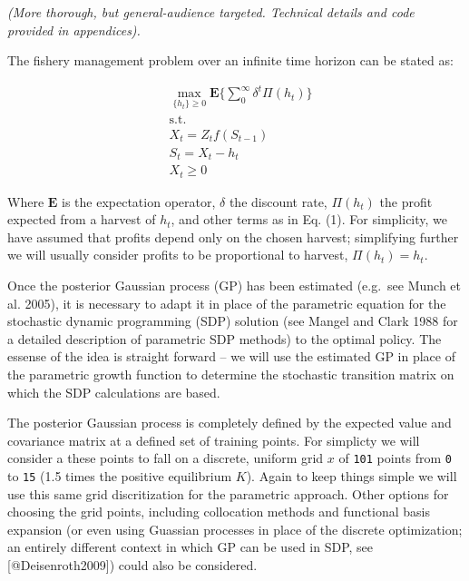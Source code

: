 \documentclass[author-year, review]{elsarticle} %
\begin{document}
\emph{(More thorough, but general-audience targeted. Technical details
and code provided in appendices).}

The fishery management problem over an infinite time horizon can be
stated as:

\begin{align}
& \max_{ \{h_t\} \geq 0 } \mathbf{E} \lbrace \sum_0^\infty \delta^t \Pi(h_t) \rbrace \\
& \mathrm{s.t.}  \\
 & X_t = Z_t f\left(S_{t-1}\right) \\
 & S_t = X_t - h_t \\
 & X_t  \geq 0 
\end{align}

Where $\mathbf{E}$ is the expectation operator, $\delta$ the discount
rate, $\Pi(h_t)$ the profit expected from a harvest of $h_t$, and other
terms as in Eq. (1). For simplicity, we have assumed that profits depend
only on the chosen harvest; simplifying further we will usually consider
profits to be proportional to harvest, $\Pi(h_t) = h_t$.

Once the posterior Gaussian process (GP) has been estimated (e.g.~see
Munch et al. 2005), it is necessary to adapt it in place of the
parametric equation for the stochastic dynamic programming (SDP)
solution (see Mangel and Clark 1988 for a detailed description of
parametric SDP methods) to the optimal policy. The essense of the idea
is straight forward -- we will use the estimated GP in place of the
parametric growth function to determine the stochastic transition matrix
on which the SDP calculations are based.

The posterior Gaussian process is completely defined by the expected
value and covariance matrix at a defined set of training points. For
simplicty we will consider a these points to fall on a discrete, uniform
grid $x$ of \texttt{101} points from \texttt{0} to \texttt{15} (1.5
times the positive equilibrium $K$). Again to keep things simple we will
use this same grid discritization for the parametric approach. Other
options for choosing the grid points, including collocation methods and
functional basis expansion (or even using Guassian processes in place of
the discrete optimization; an entirely different context in which GP can
be used in SDP, see {[}@Deisenroth2009{]}) could also be considered.
\end{document}
